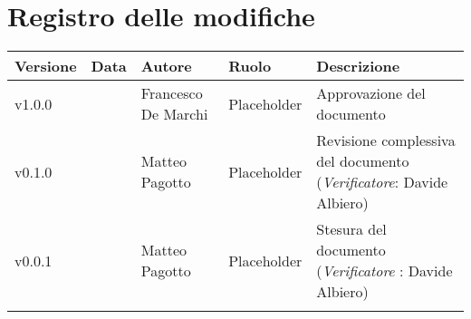 \section*{\hfil Registro delle modifiche \hfil}
{
	\newlength{\freewidth}
	\setlength{\freewidth}{\dimexpr\textwidth-10\tabcolsep}
	\renewcommand{\arraystretch}{1.5}
	\centering
	\setlength{\aboverulesep}{0pt}
	\setlength{\belowrulesep}{0pt}
	\begin{longtable}{C{.131777\freewidth} C{.134036\freewidth} C{.263554\freewidth} C{.188254\freewidth} C{.282379\freewidth}}
		\toprule 
		\textbf{Versione} & \textbf{Data} & \textbf{Autore} & \textbf{Ruolo} & \textbf{Descrizione}\\
		\toprule
		\endhead
		
		v1.0.0 & \DataDoc{} &Francesco De Marchi & Placeholder & Approvazione del documento \\  
		v0.1.0 & \DataDoc{} & Matteo Pagotto & Placeholder & Revisione complessiva del documento (\textit{Verificatore}: Davide Albiero) \\ 
		v0.0.1 & \DataDoc{} & Matteo Pagotto & Placeholder & Stesura del documento (\textit{Verificatore} : Davide Albiero) \\
		
		
		\bottomrule
		\hiderowcolors
	\end{longtable}
}
